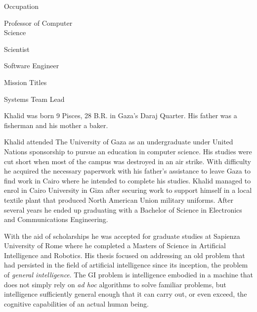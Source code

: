 {        \bTR
            \bTC Occupation \eTC
            \bTC 
                \startitemize[4]
                \startpacked
                \item Professor of Computer\\Science
                \item Scientist
                \item Software Engineer
                \stoppacked
                \stopitemize
            \eTC
        \eTR
        
        \bTR
            \bTC Mission Titles \eTC
            \bTC 
                \startitemize[4]
                \startpacked
                \item Systems Team Lead
                \stoppacked
                \stopitemize
            \eTC
        \eTR
    \eTABLEbody

\eTABLE
}

Khalid was born 9 Pisces, 28 B.R. in Gaza's Daraj Quarter. His father was a fisherman and his mother a baker.

Khalid attended The University of Gaza as an undergraduate under United Nations sponsorship to pursue an education in computer science. His studies were cut short when most of the campus was destroyed in an air strike. With difficulty he acquired the necessary paperwork with his father's assistance to leave Gaza to find work in Cairo where he intended to complete his studies. Khalid managed to enrol in Cairo University in Giza after securing work to support himself in a local textile plant that produced North American Union military uniforms. After several years he ended up graduating with a Bachelor of Science in Electronics and Communications Engineering.

With the aid of scholarships he was accepted for graduate studies at Sapienza University of Rome where he completed a Masters of Science in Artificial Intelligence and Robotics. His thesis focused on addressing an old problem that had persisted in the field of artificial intelligence since its inception, the problem of {\it general intelligence}. The GI problem is intelligence embodied in a machine that does not simply rely on {\it ad hoc} algorithms to solve familiar problems, but intelligence sufficiently general enough that it can carry out, or even exceed, the cognitive capabilities of an actual human being.

